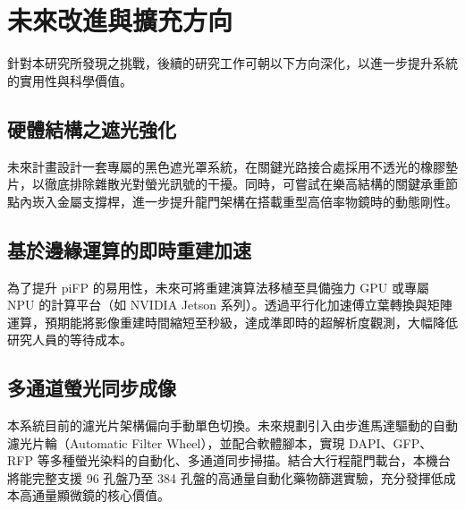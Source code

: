 \section{未來改進與擴充方向}

針對本研究所發現之挑戰，後續的研究工作可朝以下方向深化，以進一步提升系統的實用性與科學價值。

\subsection{硬體結構之遮光強化}

未來計畫設計一套專屬的黑色遮光罩系統，在關鍵光路接合處採用不透光的橡膠墊片，以徹底排除雜散光對螢光訊號的干擾。同時，可嘗試在樂高結構的關鍵承重節點內崁入金屬支撐桿，進一步提升龍門架構在搭載重型高倍率物鏡時的動態剛性。

\subsection{基於邊緣運算的即時重建加速}

為了提升 piFP 的易用性，未來可將重建演算法移植至具備強力 GPU 或專屬 NPU 的計算平台（如 NVIDIA Jetson 系列）。透過平行化加速傅立葉轉換與矩陣運算，預期能將影像重建時間縮短至秒級，達成準即時的超解析度觀測，大幅降低研究人員的等待成本。

\subsection{多通道螢光同步成像}

本系統目前的濾光片架構偏向手動單色切換。未來規劃引入由步進馬達驅動的自動濾光片輪（Automatic Filter Wheel），並配合軟體腳本，實現 DAPI、GFP、RFP 等多種螢光染料的自動化、多通道同步掃描。結合大行程龍門載台，本機台將能完整支援 96 孔盤乃至 384 孔盤的高通量自動化藥物篩選實驗，充分發揮低成本高通量顯微鏡的核心價值。
